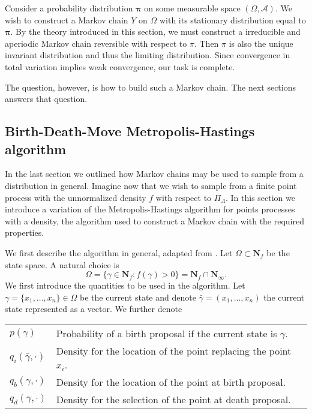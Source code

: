 Consider a probability distribution $\mathbf \pi$ on some measurable space $(\Omega,\mathcal A)$. We wish to construct a Markov chain $Y$ on $\Omega$ with its stationary distribution equal to $\mathbf \pi$. By the theory introduced in this section, we must construct a irreducible and aperiodic Markov chain reversible with respect to $\pi$. Then $\pi$ is also the unique invariant distribution and thus the limiting distribution. Since convergence in total variation implies weak convergence, our task is complete.

The question, however, is how to build such a Markov chain. The next sections answers that question. 



\subsection{Birth-Death-Move Metropolis-Hastings algorithm}
In the last section we outlined how Markov chains may be used to sample from a distribution in general. Imagine now that we wish to sample from a finite point process with the unnormalized density $f$ with respect to $\Pi_\Lambda$. In this section we introduce a variation of the Metropolis-Hastings algorithm for points processes with a density, the algorithm used to construct a Markov chain with the required properties. 

We first describe the algorithm in general, adapted from \cite{MollerWaagepetersen2003}.  \newline
\noindent Let $\Omega\subset \mathbf N_f$ be the state space. A natural choice is 
$$\Omega=\{\gamma \in \mathbf N_f: f(\gamma)>0 \} = \mathbf N_f \cap \mathbf N_\infty.$$
We first introduce the quantities to be used in the algorithm. Let $\gamma = \{x_1,\dots, x_n\} \in \Omega$ be the current state and denote $\bar\gamma = (x_1,\dots, x_n)$ the current state represented as a vector. We further denote 

\begin{tabular}{ll}
$p(\gamma)$ & Probability of a birth proposal if the current state is $\gamma$.  \\
$q_i(\bar\gamma,\cdot)$ & Density for the location of the point replacing the point $x_i$. \\
$q_b(\gamma,\cdot)$ & Density for the location of the point at birth proposal. \\
$q_d(\gamma,\cdot)$ & Density for the selection of the point at death proposal. 
\end{tabular}

